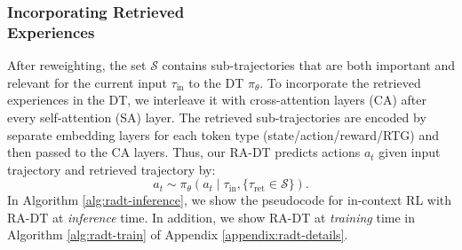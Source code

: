 \documentclass{article}
\newcommand{\cS}{\mathcal{S}} \newcommand{\cT}{\mathcal{T}}
\begin{document}
\subsubsection{Incorporating Retrieved \\Experiences}
After reweighting, the set $\cS$ contains sub-trajectories that are both important and relevant for the current input $\tau_{\text{in}}$ to the DT $\pi_\theta$.
To incorporate the retrieved experiences in the DT, we interleave it with cross-attention layers (CA) after every self-attention (SA) layer.
The retrieved sub-trajectories are encoded by separate embedding layers for each token type (state/action/reward/RTG) and then passed to the CA layers.
Thus, our RA-DT predicts actions $a_t$ given input trajectory and retrieved trajectory by:
\begin{equation}\label{eq:predict}
    a_t \sim \pi_{\theta} (a_t \mid \tau_{\text{in}}, \{\tau_{\text{ret}} \in \cS\}).
\end{equation}
In Algorithm \ref{alg:radt-inference}, we show the pseudocode for in-context RL with RA-DT at \emph{inference} time.
In addition, we show RA-DT at \emph{training} time in Algorithm \ref{alg:radt-train} of Appendix \ref{appendix:radt-details}.
\end{document}
